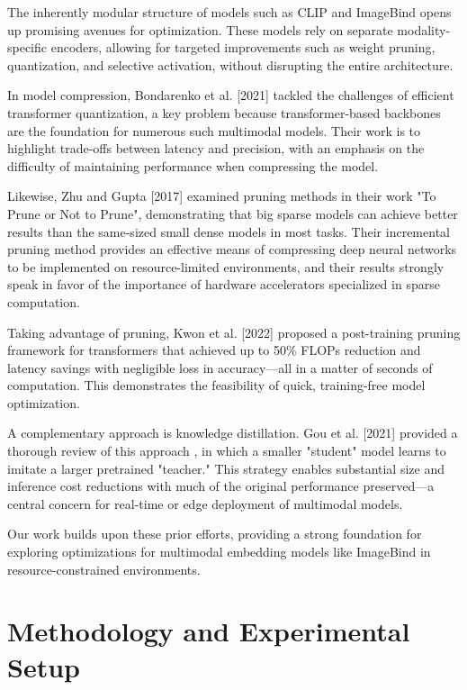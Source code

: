 \documentclass[runningheads]{IEEEtran}
\begin{document}
The inherently modular structure of models such as CLIP and ImageBind opens up promising avenues for optimization. These models rely on separate modality-specific encoders, allowing for targeted improvements such as weight pruning, quantization, and selective activation, without disrupting the entire architecture.

In model compression, Bondarenko et al. [2021] tackled the challenges of efficient transformer quantization\cite{bondarenko2021understandingovercomingchallengesefficient}, a key problem because transformer-based backbones are the foundation for numerous such multimodal models. Their work is to highlight trade-offs between latency and precision, with an emphasis on the difficulty of maintaining performance when compressing the model.

Likewise, Zhu and Gupta [2017] examined pruning methods in their work "To Prune or Not to Prune"\cite{zhu2017prunepruneexploringefficacy}, demonstrating that big sparse models can achieve better results than the same-sized small dense models in most tasks. Their incremental pruning method provides an effective means of compressing deep neural networks to be implemented on resource-limited environments, and their results strongly speak in favor of the importance of hardware accelerators specialized in sparse computation.

Taking advantage of pruning, Kwon et al. [2022] proposed a post-training pruning framework for transformers\cite{kwon2022fastposttrainingpruningframework} that achieved up to 50\% FLOPs reduction and latency savings with negligible loss in accuracy—all in a matter of seconds of computation. This demonstrates the feasibility of quick, training-free model optimization.

A complementary approach is knowledge distillation. Gou et al. [2021] provided a thorough review of this approach \cite{Gou_2021}, in which a smaller "student" model learns to imitate a larger pretrained "teacher." This strategy enables substantial size and inference cost reductions with much of the original performance preserved—a central concern for real-time or edge deployment of multimodal models.

Our work builds upon these prior efforts, providing a strong foundation for exploring optimizations for multimodal embedding models like ImageBind in resource-constrained environments.

\section{Methodology and Experimental Setup}
\end{document}
